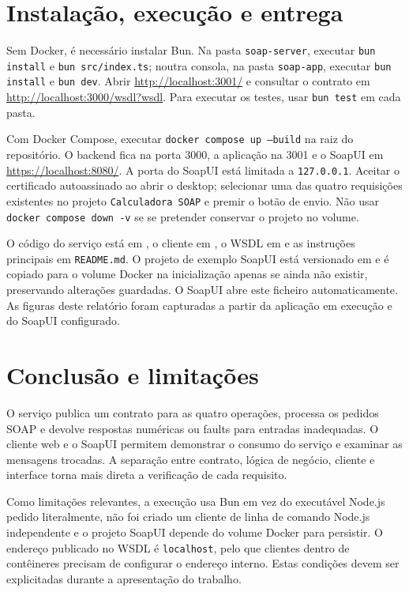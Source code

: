 \documentclass[11pt,a4paper]{article}
\begin{document}
\section{Instalação, execução e entrega}
Sem Docker, é necessário instalar Bun. Na pasta \texttt{soap-server}, executar \texttt{bun install} e \texttt{bun src/index.ts}; noutra consola, na pasta \texttt{soap-app}, executar \texttt{bun install} e \texttt{bun dev}. Abrir \url{http://localhost:3001/} e consultar o contrato em \url{http://localhost:3000/wsdl?wsdl}. Para executar os testes, usar \texttt{bun test} em cada pasta.

Com Docker Compose, executar \texttt{docker compose up --build} na raiz do repositório. O backend fica na porta 3000, a aplicação na 3001 e o SoapUI em \url{https://localhost:8080/}. A porta do SoapUI está limitada a \texttt{127.0.0.1}. Aceitar o certificado autoassinado ao abrir o desktop; selecionar uma das quatro requisições existentes no projeto \texttt{Calculadora SOAP} e premir o botão de envio. Não usar \texttt{docker compose down -v} se se pretender conservar o projeto no volume.

O código do serviço está em , o cliente em , o WSDL em  e as instruções principais em \texttt{README.md}. O projeto de exemplo SoapUI está versionado em  e é copiado para o volume Docker na inicialização apenas se ainda não existir, preservando alterações guardadas. O SoapUI abre este ficheiro automaticamente. As figuras deste relatório foram capturadas a partir da aplicação em execução e do SoapUI configurado.

\section{Conclusão e limitações}
O serviço publica um contrato para as quatro operações, processa os pedidos SOAP e devolve respostas numéricas ou faults para entradas inadequadas. O cliente web e o SoapUI permitem demonstrar o consumo do serviço e examinar as mensagens trocadas. A separação entre contrato, lógica de negócio, cliente e interface torna mais direta a verificação de cada requisito.

Como limitações relevantes, a execução usa Bun em vez do executável Node.js pedido literalmente, não foi criado um cliente de linha de comando Node.js independente e o projeto SoapUI depende do volume Docker para persistir. O endereço publicado no WSDL é \texttt{localhost}, pelo que clientes dentro de contêineres precisam de configurar o endereço interno. Estas condições devem ser explicitadas durante a apresentação do trabalho.
\end{document}
